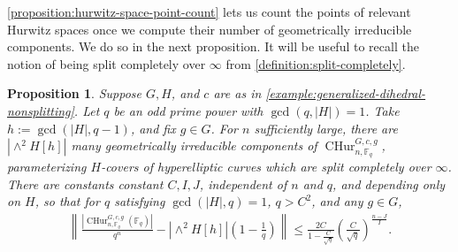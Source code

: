 \documentclass[12 pt]{amsart}
\theoremstyle{plain}
\newtheorem{proposition}[theorem]{Proposition}
\theoremstyle{definition}
\theoremstyle{remark}
\numberwithin{equation}{section}
\newcommand{\boundarycphur}[5]{\operatorname{CHur}^{#1, #3, #5}_{#2, #4}}
\begin{document}
\autoref{proposition:hurwitz-space-point-count} lets us count the points
of relevant Hurwitz spaces once we compute their number of geometrically
irreducible components. We do so in the next proposition.
It will be useful to recall the notion of being split completely over $\infty$
from
\autoref{definition:split-completely}.

\begin{proposition}
	\label{proposition:component-count}
	Suppose $G, H$, and $c$ are as in
\autoref{example:generalized-dihedral-nonsplitting}.
	Let $q$ be an odd prime power with $\gcd(q,|H|) = 1$. Take $h := \gcd(|H|, q-1)$, and fix $g
	\in G$.
		For $n$ sufficiently large, there are $|\wedge^2 H[h]|$ many
	geometrically irreducible components 
	of $\boundarycphur G n c {\mathbb F_q} g$,
	parameterizing $H$-covers of hyperelliptic
	curves which are split completely over $\infty$. 
	There are constants constant $C, I, J$, independent of $n$ and $q$, and
	depending only on $H$, so that for $q$ satisfying $\gcd( |H|, q) = 1$,
	$q > C^2$, 
	and any $g \in G$,
	\begin{align}
		\label{equation:hurwitz-point-count-from-components}
		\left \|  \frac{\left|\boundarycphur G n c {\mathbb F_q} g(\mathbb
		F_q)\right|}{q^n} -
		|\wedge^2 H[h]| \left(1 -
		\frac{1}{q}\right)
		\right \| \leq 
		\frac{2C}{1- \frac{C}{\sqrt{q}}}
		\left(\frac{C}{\sqrt{q}}\right)^{\frac{n-J}{I}}.
	\end{align}
	\end{proposition}
\end{document}
